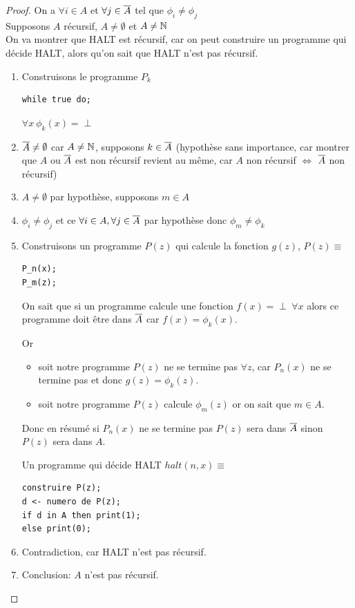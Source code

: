 \begin{proof}
On a $\forall i \in A$ et $\forall j \in \overline{A}$ tel que $\phi_i \neq
\phi_j$\\
Supposons $A$ récursif, $A \neq \emptyset$ et $A\neq \mathbb{N}$\\
On va montrer que HALT est récursif, car on peut construire un programme qui
décide HALT, alors qu'on sait que HALT n'est pas récursif.

\begin{enumerate}
	\item Construisons le programme $P_k$
\begin{lstlisting}
while true do;
\end{lstlisting}
	$\forall x \ \phi_k(x) = \perp$
	\item $\overline{A}\neq \emptyset$ car $A \neq \mathbb{N}$,
	supposons $k\in \overline{A}$ (hypothèse sans importance, car montrer que
	$A$ ou $\overline{A}$ est non récursif revient au même, car $A$ non
	récursif $ \Leftrightarrow $ $\overline{A}$ non récursif)
	\item $A\neq \emptyset$ par hypothèse, supposons $m\in A$
	\item $\phi_i \neq \phi_j$ et ce $\forall i \in A, \forall j \in \overline{A}$ par hypothèse donc
		$\phi_m \neq \phi_k$
	\item Construisons un programme $P(z)$ qui calcule la fonction $g(z)$,
		$P(z) \equiv $
\begin{lstlisting}
P_n(x);
P_m(z);
\end{lstlisting}
	\begin{myrem}
		On sait que si un programme calcule une fonction $
		f(x)=\perp \ \forall x$ alors ce programme doit être dans $\overline{A}$ car
		$f(x) =\phi_k(x)$.

		Or
		\begin{itemize}
			\item soit notre programme $P(z)$ ne se termine pas $\forall z$, car $P_n(x)$ ne se termine pas et donc $g(z) = 		\phi_k(z)$.
		\item soit notre programme $P(z)$ calcule $\phi_m(z)$ or on
			sait que $m\in A$.
		\end{itemize}
        Donc en résumé si $P_n(x)$ ne se termine pas $P(z)$ sera dans
        $\overline{A}$ sinon $P(z)$ sera dans $A$.
	\end{myrem}
	Un programme qui décide HALT $halt(n,x) \equiv $
\begin{lstlisting}
construire P(z);
d <- numero de P(z);
if d in A then print(1);
else print(0);
\end{lstlisting}
	\item Contradiction, car HALT n'est pas récursif.
	\item Conclusion: $A$ n'est pas récursif.
\end{enumerate}
\end{proof}

